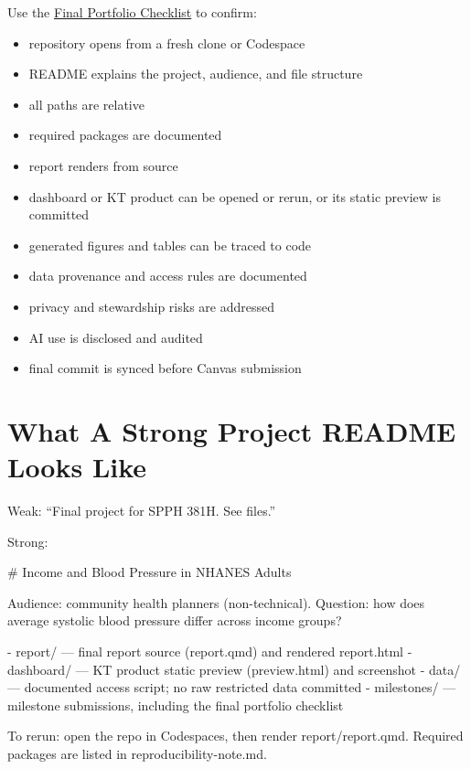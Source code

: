\documentclass[
  letterpaper,
  DIV=11,
  numbers=noendperiod,
  oneside]{scrreprt}
\newenvironment{Shaded}{\begin{snugshade}}{\end{snugshade}}
\newcommand{\NormalTok}[1]{\textcolor[rgb]{0.00,0.23,0.31}{#1}}
\providecommand{\tightlist}{%
  \setlength{\itemsep}{0pt}\setlength{\parskip}{0pt}}
\begin{document}
Use the \href{final-portfolio-checklist.md}{Final Portfolio Checklist}
to confirm:

\begin{itemize}
\tightlist
\item
  repository opens from a fresh clone or Codespace
\item
  README explains the project, audience, and file structure
\item
  all paths are relative
\item
  required packages are documented
\item
  report renders from source
\item
  dashboard or KT product can be opened or rerun, or its static preview
  is committed
\item
  generated figures and tables can be traced to code
\item
  data provenance and access rules are documented
\item
  privacy and stewardship risks are addressed
\item
  AI use is disclosed and audited
\item
  final commit is synced before Canvas submission
\end{itemize}

\section{What A Strong Project README Looks
Like}\label{what-a-strong-project-readme-looks-like}

Weak: ``Final project for SPPH 381H. See files.''

Strong:

\begin{Shaded}
\begin{Highlighting}[numbers=left,,]
\NormalTok{\# Income and Blood Pressure in NHANES Adults}

\NormalTok{Audience: community health planners (non{-}technical).}
\NormalTok{Question: how does average systolic blood pressure differ across income groups?}

\NormalTok{{-} report/    — final report source (report.qmd) and rendered report.html}
\NormalTok{{-} dashboard/ — KT product static preview (preview.html) and screenshot}
\NormalTok{{-} data/      — documented access script; no raw restricted data committed}
\NormalTok{{-} milestones/ — milestone submissions, including the final portfolio checklist}

\NormalTok{To rerun: open the repo in Codespaces, then render report/report.qmd.}
\NormalTok{Required packages are listed in reproducibility{-}note.md.}
\end{Highlighting}
\end{Shaded}
\end{document}
